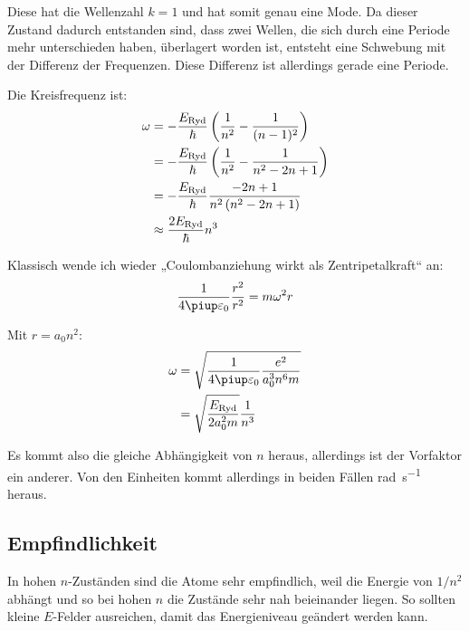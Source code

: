 Diese hat die Wellenzahl $k = 1$ und hat somit genau eine Mode. Da dieser
Zustand dadurch entstanden sind, dass zwei Wellen, die sich durch eine Periode
mehr unterschieden haben, überlagert worden ist, entsteht eine Schwebung mit
der Differenz der Frequenzen. Diese Differenz ist allerdings gerade eine
Periode.

Die Kreisfrequenz ist:
\begin{align*}
	\omega
	&= - \frac{E_\text{Ryd}}\hbar \del{\frac1{n^2} - \frac1{(n-1)^2}} \\
	&= - \frac{E_\text{Ryd}}\hbar \del{\frac1{n^2} - \frac1{n^2 - 2n + 1}} \\
	&= - \frac{E_\text{Ryd}}\hbar \frac{-2n + 1}{n^2 \del{n^2 - 2n + 1}} \\
	&\approx \frac{2E_\text{Ryd}}\hbar {n^3} \\
\end{align*}

Klassisch wende ich wieder „Coulombanziehung wirkt als Zentripetalkraft“ an:
\[
	\frac{1}{4\piup \varepsilon_0} \frac{r^2}{r^2} = m \omega^2 r
\]

Mit $r = a_0 n^2$:
\begin{align*}
	\omega &= \sqrt{\frac{1}{4\piup \varepsilon_0} \frac{e^2}{a_0^3 n^6 m}} \\
					   &= \sqrt{\frac{E_\text{Ryd}}{2a_0^2m}} \frac{1}{n^3}
\end{align*}

Es kommt also die gleiche Abhängigkeit von $n$ heraus, allerdings ist der
Vorfaktor ein anderer. Von den Einheiten kommt allerdings in beiden Fällen
\si{\radian\per\second} heraus.

\fehlt

\subsection{Empfindlichkeit}

In hohen $n$-Zuständen sind die Atome sehr empfindlich, weil die Energie von
$1/n^2$ abhängt und so bei hohen $n$ die Zustände sehr nah beieinander liegen.
So sollten kleine $E$-Felder ausreichen, damit das Energieniveau geändert
werden kann.

\fehlt


\IfFileExists{\bibliographyfile}{
}{}



